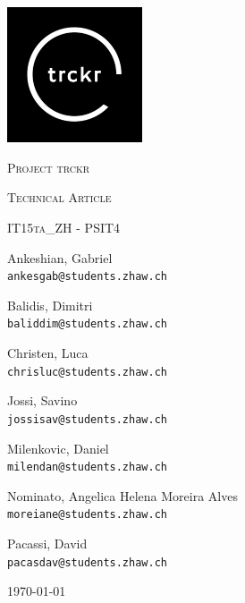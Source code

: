 \documentclass[bibliography=totoc, listof=totocnumbered]{scrartcl}
\begin{document}
\begin{titlepage}
\thispagestyle{firstpage}
\centering
\includegraphics[width=0.3\textwidth]{logo}\par
\vspace{1cm}

{\scshape\LARGE Project trckr \par}
\vspace{0.3cm}

{\scshape\Large Technical Article\par}
\vspace{0.5cm}

{\scshape IT15ta\_ZH - PSIT4\par}
\vspace{0.5cm}
Ankeshian, Gabriel\\
\texttt{ankesgab@students.zhaw.ch}

\vspace{0.2cm}
Balidis, Dimitri\\
\texttt{baliddim@students.zhaw.ch}

\vspace{0.2cm}
Christen, Luca\\
\texttt{chrisluc@students.zhaw.ch}

\vspace{0.2cm}
Jossi, Savino\\
\texttt{jossisav@students.zhaw.ch}

\vspace{0.2cm}
Milenkovic, Daniel\\
\texttt{milendan@students.zhaw.ch}

\vspace{0.2cm}
Nominato, Angelica Helena Moreira Alves\\
\texttt{moreiane@students.zhaw.ch}

\vspace{0.2cm}
Pacassi, David\\
\texttt{pacasdav@students.zhaw.ch}

\vfill

	{\large \today\par}
\end{titlepage}
\end{document}

